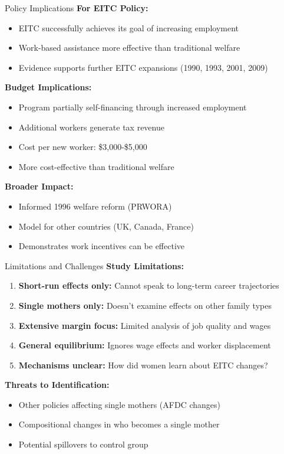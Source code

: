 \documentclass[aspectratio=169]{beamer}
\begin{document}
\begin{frame}{Policy Implications}
\textbf{For EITC Policy:}
\begin{itemize}
    \item EITC successfully achieves its goal of increasing employment
    \item Work-based assistance more effective than traditional welfare
    \item Evidence supports further EITC expansions (1990, 1993, 2001, 2009)
\end{itemize}

\vspace{0.3cm}
\textbf{Budget Implications:}
\begin{itemize}
    \item Program partially self-financing through increased employment
    \item Additional workers generate tax revenue
    \item Cost per new worker: \$3,000-\$5,000
    \item More cost-effective than traditional welfare
\end{itemize}

\vspace{0.3cm}
\textbf{Broader Impact:}
\begin{itemize}
    \item Informed 1996 welfare reform (PRWORA)
    \item Model for other countries (UK, Canada, France)
    \item Demonstrates work incentives can be effective
\end{itemize}
\end{frame}

\begin{frame}{Limitations and Challenges}
\textbf{Study Limitations:}
\begin{enumerate}
    \item \textbf{Short-run effects only:} Cannot speak to long-term career trajectories
    \item \textbf{Single mothers only:} Doesn't examine effects on other family types
    \item \textbf{Extensive margin focus:} Limited analysis of job quality and wages
    \item \textbf{General equilibrium:} Ignores wage effects and worker displacement
    \item \textbf{Mechanisms unclear:} How did women learn about EITC changes?
\end{enumerate}

\vspace{0.3cm}
\textbf{Threats to Identification:}
\begin{itemize}
    \item Other policies affecting single mothers (AFDC changes)
    \item Compositional changes in who becomes a single mother
    \item Potential spillovers to control group
\end{itemize}
\end{frame}
\end{document}
